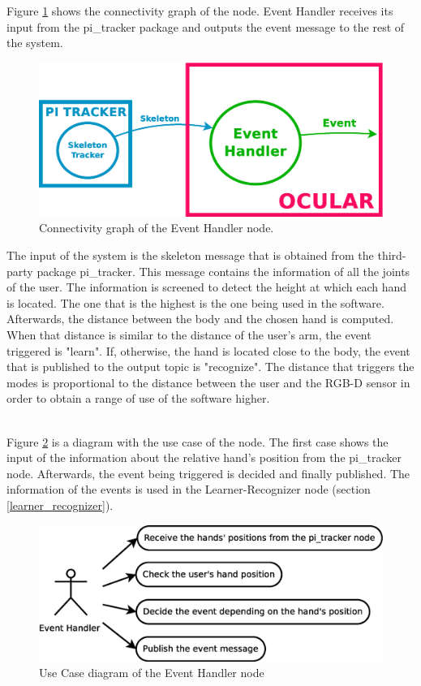 	Figure \ref{node_event_io} shows the connectivity graph of the node. 
	Event Handler receives its input from the pi\_tracker package and outputs the event message to the rest of the system. 
		\begin{figure}[H]
			\begin{center}
			\includegraphics[width=0.5\linewidth]{img/diagrams/node_event.eps}
			\caption[Event Handler 3D node I/O]{Connectivity graph of the Event Handler node.}		
			\end{center}
			\label{node_event_io}

		\end{figure}
	The input of the system is the skeleton message that is obtained from the third-party package pi\_tracker. This message contains the information of all the joints of the user. The information is screened to detect the height at which each hand is located. The one that is the highest is the one being used in the software. Afterwards, the distance between the body and the chosen hand is computed. When that distance is similar to the distance of the user's arm, the event triggered is "learn". If, otherwise, the hand is located close to the body, the event that is published to the output topic is "recognize". 
	The distance that triggers the modes is proportional to the distance between the user and the RGB-D sensor in order to obtain a range of use of the software higher. 
	
	\\

	Figure \ref{uc_event} is a diagram with the use case of the node. 
	The first case shows the input of the information about the relative hand's position from the pi\_tracker node. 
	Afterwards, the event being triggered is decided and finally published. 
	The information of the events is used in the Learner-Recognizer node (section \ref{learner_recognizer}).
	\begin{figure}[H]
		\centering
			\includegraphics[scale=0.4]{img/diagrams/uc_event_handler.eps}
			\caption[Use case diagram Event Handler node]{Use Case diagram of the Event Handler node}
		\label{uc_event}
	\end{figure}

